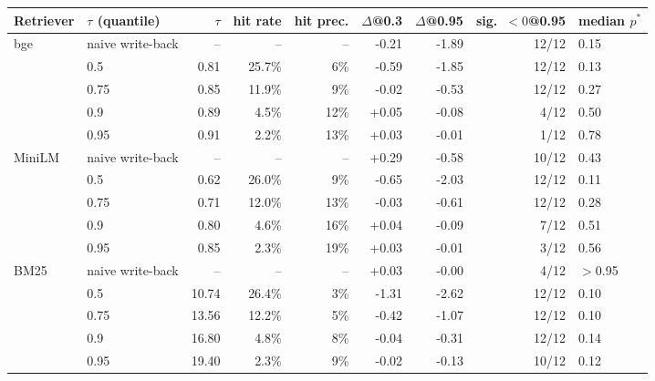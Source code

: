 \begin{tabular}{llrrrrrrl}\toprule Retriever & $\tau$ (quantile) & $\tau$ & hit rate & hit prec. & $\Delta$@0.3 & $\Delta$@0.95 & sig.\ $<0$@0.95 & median $p^*$\\\midrule
bge & naive write-back & -- & -- & -- & -0.21 & -1.89 & 12/12 & 0.15\\
 & 0.5 & 0.81 & 25.7\% & 6\% & -0.59 & -1.85 & 12/12 & 0.13\\
 & 0.75 & 0.85 & 11.9\% & 9\% & -0.02 & -0.53 & 12/12 & 0.27\\
 & 0.9 & 0.89 & 4.5\% & 12\% & +0.05 & -0.08 & 4/12 & 0.50\\
 & 0.95 & 0.91 & 2.2\% & 13\% & +0.03 & -0.01 & 1/12 & 0.78\\
\addlinespace[2pt]
MiniLM & naive write-back & -- & -- & -- & +0.29 & -0.58 & 10/12 & 0.43\\
 & 0.5 & 0.62 & 26.0\% & 9\% & -0.65 & -2.03 & 12/12 & 0.11\\
 & 0.75 & 0.71 & 12.0\% & 13\% & -0.03 & -0.61 & 12/12 & 0.28\\
 & 0.9 & 0.80 & 4.6\% & 16\% & +0.04 & -0.09 & 7/12 & 0.51\\
 & 0.95 & 0.85 & 2.3\% & 19\% & +0.03 & -0.01 & 3/12 & 0.56\\
\addlinespace[2pt]
BM25 & naive write-back & -- & -- & -- & +0.03 & -0.00 & 4/12 & $>$0.95\\
 & 0.5 & 10.74 & 26.4\% & 3\% & -1.31 & -2.62 & 12/12 & 0.10\\
 & 0.75 & 13.56 & 12.2\% & 5\% & -0.42 & -1.07 & 12/12 & 0.10\\
 & 0.9 & 16.80 & 4.8\% & 8\% & -0.04 & -0.31 & 12/12 & 0.14\\
 & 0.95 & 19.40 & 2.3\% & 9\% & -0.02 & -0.13 & 10/12 & 0.12\\
\bottomrule\end{tabular}